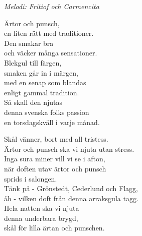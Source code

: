 {\footnotesize\textit{Melodi: Fritiof och Carmencita}}\par
\vspace{10pt}
Ärtor och punsch,\\
en liten rätt med traditioner.\\
Den smakar bra\\
och väcker många sensationer.\\
Blekgul till färgen,\\
smaken går in i märgen,\\
med en senap som blandas\\
enligt gammal tradition.\\
Så skall den njutas\\
denna svenska folks passion\\
en torsdagskväll i varje månad.\par
\vspace{10pt}
Skål vänner, bort med all tristess.\\
Ärtor och punsch ska vi njuta utan stress.\\
Inga sura miner vill vi se i afton,\\
när doften utav ärtor och punsch\\
sprids i salongen.\\
Tänk på - Grönstedt, Cederlund och Flagg,\\
åh - vilken doft från denna arraksgula tagg.\\
Hela natten ska vi njuta\\
denna underbara brygd,\\
skål för lilla ärtan och punschen.

